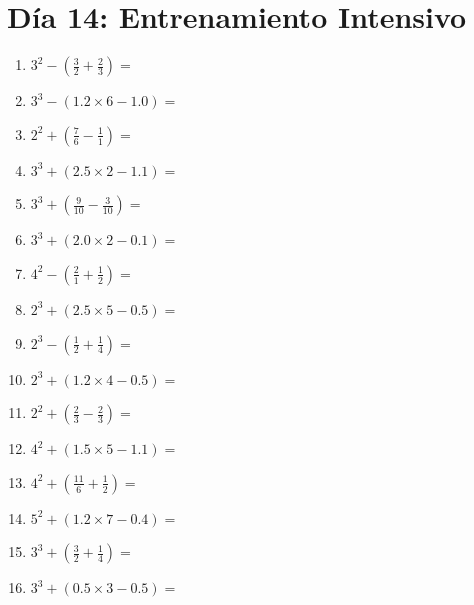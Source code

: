 \documentclass[12pt]{article}
\begin{document}
\section*{Día 14: Entrenamiento Intensivo}
\begin{enumerate}
\item \large $ 3^{2} - (\frac{3}{2} + \frac{2}{3}) = $ \vspace{1.6cm}
\item \large $ 3^{3} - (1.2 \times 6 - 1.0) = $ \vspace{1.6cm}
\item \large $ 2^{2} + (\frac{7}{6} - \frac{1}{1}) = $ \vspace{1.6cm}
\item \large $ 3^{3} + (2.5 \times 2 - 1.1) = $ \vspace{1.6cm}
\item \large $ 3^{3} + (\frac{9}{10} - \frac{3}{10}) = $ \vspace{1.6cm}
\item \large $ 3^{3} + (2.0 \times 2 - 0.1) = $ \vspace{1.6cm}
\item \large $ 4^{2} - (\frac{2}{1} + \frac{1}{2}) = $ \vspace{1.6cm}
\item \large $ 2^{3} + (2.5 \times 5 - 0.5) = $ \vspace{1.6cm}
\item \large $ 2^{3} - (\frac{1}{2} + \frac{1}{4}) = $ \vspace{1.6cm}
\item \large $ 2^{3} + (1.2 \times 4 - 0.5) = $ \vspace{1.6cm}
\newpage
\item \large $ 2^{2} + (\frac{2}{3} - \frac{2}{3}) = $ \vspace{1.6cm}
\item \large $ 4^{2} + (1.5 \times 5 - 1.1) = $ \vspace{1.6cm}
\item \large $ 4^{2} + (\frac{11}{6} + \frac{1}{2}) = $ \vspace{1.6cm}
\item \large $ 5^{2} + (1.2 \times 7 - 0.4) = $ \vspace{1.6cm}
\item \large $ 3^{3} + (\frac{3}{2} + \frac{1}{4}) = $ \vspace{1.6cm}
\item \large $ 3^{3} + (0.5 \times 3 - 0.5) = $ \vspace{1.6cm}

\end{enumerate}
\end{document}
